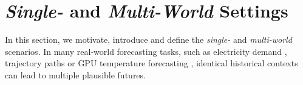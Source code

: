 \documentclass[a4paper,oneside,bibliography=totoc]{scrbook}
\begin{document}
\section{\textit{Single-} and \textit{Multi-World} Settings}
In this section, we motivate, introduce and define the \textit{single-} and \textit{multi-world} scenarios.
In many real-world forecasting tasks, such as electricity demand \cite{hyndman_density_2010, vaghefi_modeling_2014}, trajectory paths \cite{yuan_diverse_2019, mangalam_goals_2021} or GPU temperature forecasting \cite{desai_keeping_2024, wang_scheduled_2024}, identical historical contexts can lead to multiple plausible futures. 
\end{document}
